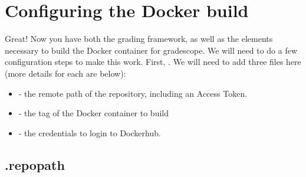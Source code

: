 \documentclass[11pt]{report}
\begin{document}
\section*{Configuring the Docker build}
Great! Now you have both the grading framework, as well as the elements necessary to build the 
Docker container for gradescope. We will need to do a few configuration steps to make this work.
First, .
We will need to add three files here (more details for each are below):
\begin{itemize}
      \item {}    - the remote path of the repository, including an Access Token.
      \item {}   - the tag of the Docker container to build
      \item {} - the credentials to login to Dockerhub.
\end{itemize}

\subsection*{.repopath}
\end{document}
